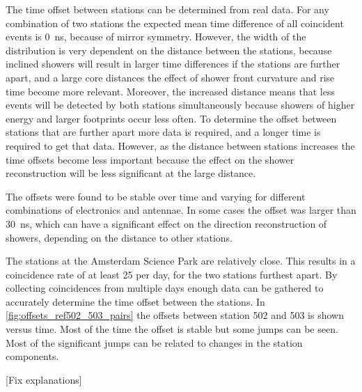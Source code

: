 The \gps time offset between stations can be determined from real data. For any combination of two stations the expected mean time difference of all coincident events is \SI{0}{\ns}, because of mirror symmetry. However, the width of the distribution is very dependent on the distance between the stations, because inclined showers will result in larger time differences if the stations are further apart, and a large core distances the effect of shower front curvature and rise time become more relevant. Moreover, the increased distance means that less events will be detected by both stations simultaneously because showers of higher energy and larger footprints occur less often. To determine the offset between stations that are further apart more data is required, and a longer time is required to get that data. However, as the distance between stations increases the time offsets become less important because the effect on the shower reconstruction will be less significant at the large distance.

The offsets were found to be stable over time and varying for different combinations of \hisparc electronics and \gps antennae. In some cases the offset was larger than \SI{30}{\ns}, which can have a significant effect on the direction reconstruction of showers, depending on the distance to other stations.

The \hisparc stations at the Amsterdam Science Park are relatively close. This results in a coincidence rate of at least 25 per day, for the two stations furthest apart. By collecting coincidences from multiple days enough data can be gathered to accurately determine the time offset between the stations. In \cref{fig:offsets_ref502_503_pairs} the offsets between station 502 and 503 is shown versus time. Most of the time the offset is stable but some jumps can be seen. Most of the significant jumps can be related to changes in the station components.

[Fix explanations]

